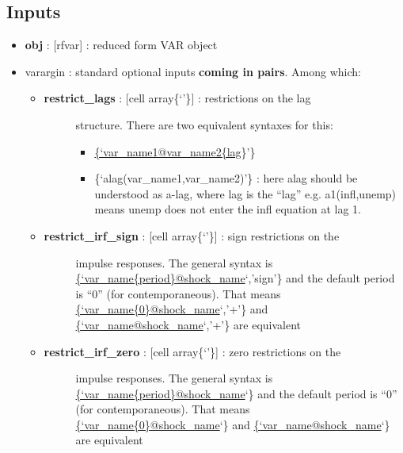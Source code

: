 \documentclass[letterpaper,10pt,english]{sphinxmanual}
\begin{document}
\subsection{Inputs}
\label{classes/models/@rfvar/rfvar:id168}\begin{itemize}
\item {} 
\textbf{obj} : {[}rfvar{]} : reduced form VAR object

\item {} 
varargin : standard optional inputs \textbf{coming in pairs}. Among which:
\begin{itemize}
\item {} \begin{description}
\item[{\textbf{restrict\_lags} : {[}cell array\textbar{}\{`'\}{]} : restrictions on the lag}] \leavevmode
structure. There are two equivalent syntaxes for this:
\begin{itemize}
\item {} 
\href{mailto:\{'var\_name1@var\_name2\{lag}{\{`var\_name1@var\_name2\{lag}\}'\}

\item {} 
\{`alag(var\_name1,var\_name2)'\} : here alag should be understood as
a-lag, where lag is the ``lag'' e.g. a1(infl,unemp) means unemp
does not enter the infl equation at lag 1.

\end{itemize}

\end{description}

\item {} \begin{description}
\item[{\textbf{restrict\_irf\_sign} : {[}cell array\textbar{}\{`'\}{]} : sign restrictions on the}] \leavevmode
impulse responses. The general syntax is
\href{mailto:\{'var\_name\{period\}@shock\_name}{\{`var\_name\{period\}@shock\_name}`,'sign'\} and the default period is
``0'' (for contemporaneous). That means
\href{mailto:\{'var\_name\{0\}@shock\_name}{\{`var\_name\{0\}@shock\_name}`,'+'\} and \href{mailto:\{'var\_name@shock\_name}{\{`var\_name@shock\_name}`,'+'\}
are equivalent

\end{description}

\item {} \begin{description}
\item[{\textbf{restrict\_irf\_zero} : {[}cell array\textbar{}\{`'\}{]} : zero restrictions on the}] \leavevmode
impulse responses. The general syntax is
\href{mailto:\{'var\_name\{period\}@shock\_name}{\{`var\_name\{period\}@shock\_name}`\} and the default period is
``0'' (for contemporaneous). That means
\href{mailto:\{'var\_name\{0\}@shock\_name}{\{`var\_name\{0\}@shock\_name}`\} and \href{mailto:\{'var\_name@shock\_name}{\{`var\_name@shock\_name}`\}
are equivalent


\end{description}
\end{itemize}
\end{itemize}
\end{document}
